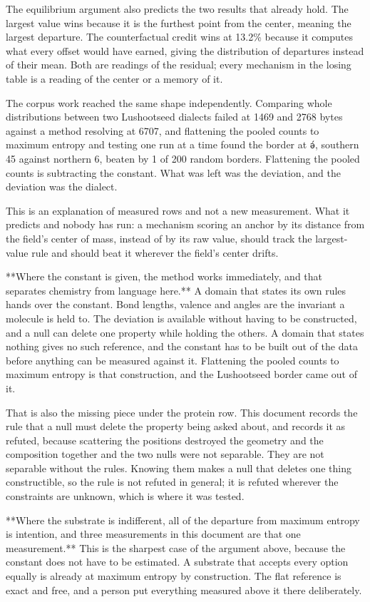 The equilibrium argument also predicts the two results that already hold. The largest value wins because it is the furthest point from the center, meaning the largest departure. The counterfactual credit wins at 13.2\% because it computes what every offset would have earned, giving the distribution of departures instead of their mean. Both are readings of the residual; every mechanism in the losing table is a reading of the center or a memory of it.

The corpus work reached the same shape independently. Comparing whole distributions between two Lushootseed dialects failed at 1469 and 2768 bytes against a method resolving at 6707, and flattening the pooled counts to maximum entropy and testing one run at a time found the border at \texttt{ə́}, southern 45 against northern 6, beaten by 1 of 200 random borders. Flattening the pooled counts is subtracting the constant. What was left was the deviation, and the deviation was the dialect.

This is an explanation of measured rows and not a new measurement. What it predicts and nobody has run: a mechanism scoring an anchor by its distance from the field's center of mass, instead of by its raw value, should track the largest-value rule and should beat it wherever the field's center drifts.

**Where the constant is given, the method works immediately, and that separates chemistry from language here.** A domain that states its own rules hands over the constant. Bond lengths, valence and angles are the invariant a molecule is held to. The deviation is available without having to be constructed, and a null can delete one property while holding the others. A domain that states nothing gives no such reference, and the constant has to be built out of the data before anything can be measured against it. Flattening the pooled counts to maximum entropy is that construction, and the Lushootseed border came out of it.

That is also the missing piece under the protein row. This document records the rule that a null must delete the property being asked about, and records it as refuted, because scattering the positions destroyed the geometry and the composition together and the two nulls were not separable. They are not separable without the rules. Knowing them makes a null that deletes one thing constructible, so the rule is not refuted in general; it is refuted wherever the constraints are unknown, which is where it was tested.

**Where the substrate is indifferent, all of the departure from maximum entropy is intention, and three measurements in this document are that one measurement.** This is the sharpest case of the argument above, because the constant does not have to be estimated. A substrate that accepts every option equally is already at maximum entropy by construction. The flat reference is exact and free, and a person put everything measured above it there deliberately.

